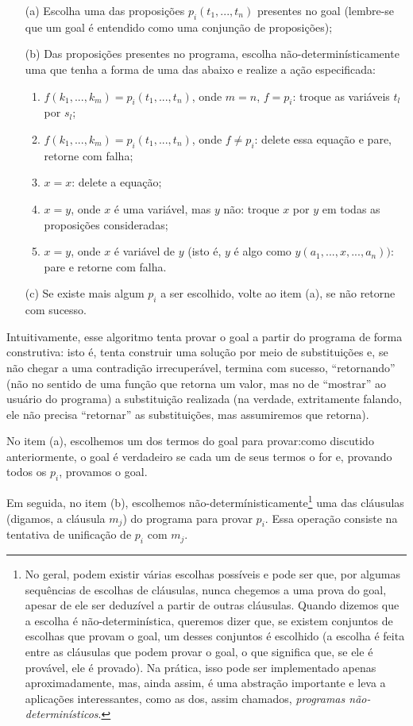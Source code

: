 \documentclass{article}
\theoremstyle{remark}
\theoremstyle{theorem}
\begin{document}
\begin{itemize}
    \item[(a)] Escolha uma das proposições $p_i(t_1, ..., t_n)$ presentes no goal (lembre-se que um goal é entendido como uma conjunção de proposições);
    \item[(b)] Das proposições presentes no programa, escolha não-determinísticamente uma que tenha a forma de uma das abaixo e realize a ação especificada:
  \begin{enumerate}
      \item $f(k_1, ..., k_m) = p_i(t_1, ..., t_n)$, onde $m = n$, $f = p_i$: troque as variáveis $t_l$ por $s_l$;
      \item $f(k_1, ..., k_m) = p_i(t_1, ..., t_n)$, onde $f \neq p_i$: delete essa equação e pare, retorne com falha;
      \item $x = x$: delete a equação;
      \item $x = y$, onde $x$ é uma variável, mas $y$ não: troque $x$ por $y$ em todas as proposições consideradas;
      \item $x = y$, onde $x$ é variável de $y$ (isto é, $y$ é algo como $y(a_1, ..., x, ..., a_n))$: pare e retorne com falha.
  \end{enumerate}
  \item[(c)] Se existe mais algum $p_i$ a ser escolhido, volte ao item (a), se não retorne com sucesso.
\end{itemize}

Intuitivamente, esse algoritmo tenta provar o goal a partir do programa de forma construtiva: isto é, tenta construir uma solução por meio de substituições e, se não chegar a uma contradição irrecuperável, termina com sucesso, ``retornando'' (não no sentido de uma função que retorna um valor, mas no de ``mostrar'' ao usuário do programa) a substituição realizada (na verdade, extritamente falando, ele não precisa ``retornar'' as substituições,
mas assumiremos que retorna).

No item (a), escolhemos um dos termos do goal para provar:como discutido anteriormente, o goal é verdadeiro se cada um de seus termos o for e, provando todos os $p_i$, provamos o goal.

Em seguida, no item (b), escolhemos não-determínisticamente\footnote{No geral, podem existir várias escolhas possíveis e pode ser que, por algumas sequências de escolhas de cláusulas, nunca chegemos a uma prova do goal, apesar de ele ser deduzível a partir de outras cláusulas. Quando dizemos que a escolha é não-determinística, queremos dizer que, se existem conjuntos de escolhas que provam o goal, um desses conjuntos é escolhido (a escolha é feita entre as cláusulas que podem provar o
  goal, o que significa que, se ele é provável, ele é provado). Na prática, isso pode ser implementado apenas aproximadamente, mas, ainda assim, é uma abstração importante e leva a aplicações interessantes, como as dos, assim chamados, \textit{programas não-determinísticos}.} uma das cláusulas (digamos, a cláusula $m_j$) do programa para provar $p_i$. Essa operação consiste na tentativa de unificação de $p_i$ com $m_j$.
\end{document}

